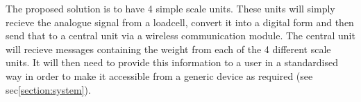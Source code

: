 The proposed solution is to have 4 simple scale units. These units will simply recieve the analogue signal from a loadcell, convert it into a digital form and then send that to a central unit via a wireless communication module. The central unit will recieve messages containing the weight from each of the 4 different scale units. It will then need to provide this information to a user in a standardised way in order to make it accessible from a generic device as required (see sec\ref{section:system}).%


